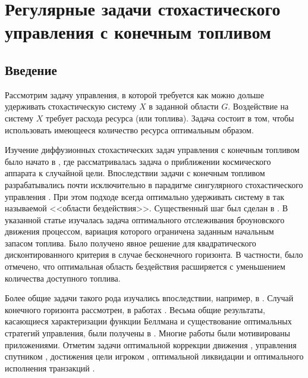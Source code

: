 \chapter{Регулярные задачи стохастического управления с конечным топливом} \label{chapt2}

\section{Введение}\label{sec:2.1}
Рассмотрим задачу управления, в которой требуется как можно дольше удерживать стохастическую систему $X$ в заданной области $G$. Воздействие на систему $X$ требует расхода ресурса (или топлива). Задача состоит в том, чтобы использовать имеющееся количество ресурса оптимальным образом.

Изучение диффузионных стохастических задач управления с конечным топливом было начато в \cite{BatChe67b}, где рассматривалась задача о приближении космического аппарата к случайной цели. Впоследствии задачи с конечным топливом разрабатывались почти исключительно в парадигме сингулярного стохастического управления \cite{BatChe67a,BatChe67b}. При этом подходе всегда оптимально удерживать систему в так называемой <<области бездействия>>. Существенный шаг был сделан в \cite{BenSheWit1980}. В указанной статье изучалась задача оптимального отслеживания броуновского движения процессом, вариация которого ограничена заданным начальным запасом топлива. Было получено явное решение для квадратического дисконтированного критерия в случае бесконечного горизонта. В частности, было отмечено, что оптимальная область бездействия расширяется с уменьшением количества доступного топлива.

Более общие задачи такого рода изучались впоследствии, например, в \cite{KarShr86,BriShr92,KarOcoWanZer00}. Случай конечного горизонта рассмотрен, в работах \cite{Kar85,ChoMenRob85,ElKKar88}. Весьма общие результаты, касающиеся характеризации функции Беллмана и существование оптимальных стратегий управления, были получены в \cite{DufMil02,MotSar07,MotSar08a,MotSar08b}. Многие работы были мотивированы приложениями. Отметим задачи оптимальной коррекции движения \cite{Che71}, управления спутником \cite{Jac83,Jac99,Jac02}, достижения цели игроком \cite{SudWee92,Wee92}, оптимальной ликвидации и
оптимального исполнения транзакций \cite{PemZhaYin07,GatSch11,BiaWuZhe14,BecBilFre15}.

